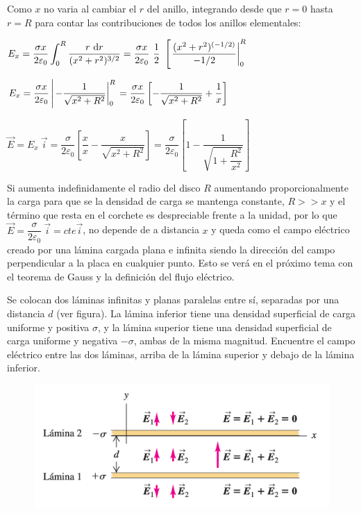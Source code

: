 Como $x$ no varia al cambiar el $r$ del anillo, integrando desde que $r=0$ hasta $r=R$ para contar las contribuciones de todos los anillos elementales:

$\displaystyle E_x= \dfrac{\sigma x}{2\varepsilon_0}\int_0^R \dfrac{r\ \dd r}{(x^2+r^2)^{3/2}}=\dfrac{\sigma x}{2\varepsilon_0} \ \dfrac 1 2 \ \left[ \eval{ \dfrac{(x^2+r^2)^{(-1/2)}}{-1/2} }_0^R \right.$

$E_x=\displaystyle
\dfrac{\sigma x}{2 \varepsilon_0} \left| \eval{-\dfrac 1 {\sqrt{x^2+R^2}}}_0^R \right.= \dfrac {\sigma x}{2\varepsilon_0} \left[ -\dfrac{1}{\sqrt{x^2+R^2}}+\dfrac 1 x \right]$

$\vec E=E_x\ \vec i = \dfrac{\sigma}{2\varepsilon_0} \left[ \dfrac x x - \dfrac x{\sqrt{x^2+R^2}}\right]= \dfrac{\sigma}{2\varepsilon_0} \left[ 1-\dfrac 1{\sqrt{1+ \dfrac {R^2}{x^2}}} \right]$


Si aumenta indefinidamente el radio del disco $R$ aumentando proporcionalmente la carga para que se la densidad de carga se mantenga constante, $R>>x$ y el término que resta en el corchete es despreciable frente a la unidad, por lo que $\vec E=\dfrac{\sigma}{2	\varepsilon_0}\ \vec i=cte \vec i$, no depende de a distancia $x$ y queda como el campo eléctrico creado por una lámina cargada plana e infinita siendo la dirección del campo perpendicular a la placa en cualquier punto. \textcolor{gris}{Esto se verá en el próximo tema con el teorema de Gauss y la definición del flujo eléctrico.}

\begin{prob}
Se colocan dos láminas infinitas y planas paralelas entre sí, separadas por una distancia $d$ (ver figura). La lámina inferior tiene una densidad superficial de carga uniforme y positiva $\sigma$, y la lámina superior tiene una densidad superficial de carga uniforme y negativa $-\sigma$, ambas de la misma magnitud. Encuentre el campo eléctrico entre las dos láminas, arriba de la lámina superior y debajo de la lámina inferior.	
\end{prob}
\begin{figure}[H]
	\centering
	\includegraphics[width=1\textwidth]{imagenes/imagenes22/T22IM24.png}
\end{figure}

